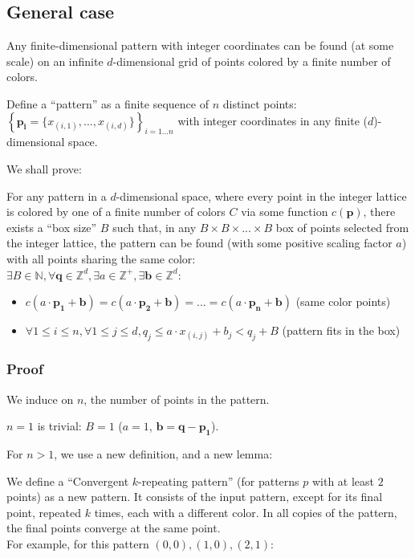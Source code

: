 \documentclass[11pt]{article}
\newcommand{\N}{\mathbb{N}}
\newcommand{\Z}{\mathbb{Z}}
\newcommand*{\scalePic}{0.4}
\newcommand*{\gridArg}[7]{%
    \foreach \x in {\fpeval{#1},\fpeval{#1+#2},...,\fpeval{#3+0.0001}} %
        \draw [black, thin, #7] (\x,\fpeval{#4}) -- (\x,\fpeval{#6+0.0001});
    \foreach \y in {\fpeval{#4},\fpeval{#4+#5},...,\fpeval{#6+0.0001}}
        \draw [black, thin, #7] (\fpeval{#1},\y) -- (\fpeval{#3+0.0001},\y);
}
\newcommand*{\grid}[6]{\gridArg{#1}{#2}{#3}{#4}{#5}{#6}{}}%
\newcommand*{\mybigbox}[4]{\grid{#1}{#3}{#1+#3}{#2}{#4}{#2+#4}} %
\newcommand*{\point}[3]{\node at (#1 + 0.5, #2 + 0.5)[circle, fill, inner sep=\scalePic*5pt, #3]{}; \gridArg{#1}{1}{#1+1}{#2}{1}{#2+1}{draw=none}}
\newcommand*{\blue}{blue!60!green}
\begin{document}
\pagebreak
\subsection*{General case}

Any finite-dimensional pattern with integer coordinates can be found (at some scale) on an infinite $d$-dimensional grid of points colored by a finite number of colors.

Define a ``pattern'' as a finite sequence of $n$ distinct points:\\
$\left\{\mathbf{p_i} = \{x_{(i,1)}, ..., x_{(i,d)}\}\right\}_{i=1...n}$ with integer coordinates in any finite ($d$)-dimensional space.

We shall prove:

For any pattern in a $d$-dimensional space, where every point in the integer lattice is colored by one of a finite number of colors $C$ via some function $c(\mathbf{p})$, there exists a ``box size'' $B$ such that, in any $B \times B \times ... \times B$ box of points selected from the integer lattice, the pattern can be found (with some positive scaling factor $a$) with all points sharing the same color:\\
$\exists B \in \N, \forall \mathbf{q} \in \Z^{d}, \exists a \in \Z^{+}, \exists \mathbf{b} \in \Z^{d}$:
\begin{itemize}
\item $c(a \cdot \mathbf{p_1} + \mathbf{b}) = c(a \cdot \mathbf{p_2} + \mathbf{b}) = ... = c(a \cdot \mathbf{p_n} + \mathbf{b})$ (same color points)
\item $\forall 1 \leq i \leq n, \forall 1 \leq j \leq d, q_j \leq a \cdot x_{(i,j)} + b_j < q_j + B$ (pattern fits in the box)
\end{itemize}


\subsubsection*{Proof}
We induce on $n$, the number of points in the pattern.

$n=1$ is trivial: $B=1$ ($a=1$, $\mathbf{b} = \mathbf{q} - \mathbf{p_1}$).

For $n>1$, we use a new definition, and a new lemma:

We define a ``Convergent $k$-repeating pattern'' (for patterns $p$ with at least $2$ points) as a new pattern. It consists of the input pattern, except for its final point, repeated $k$ times, each with a different color. In all copies of the pattern, the final points converge at the same point.\\
For example, for this pattern $(0,0), (1,0), (2,1)$:
\end{document}

